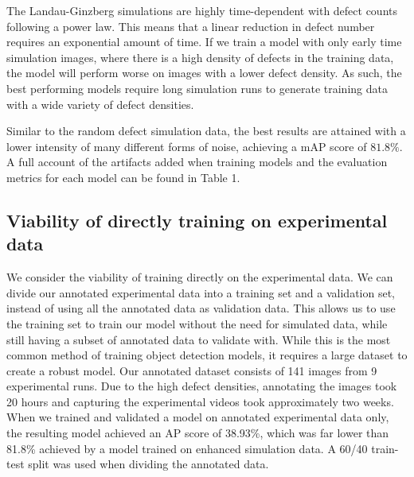 \documentclass[twoside,twocolumn,9pt]{article}
\begin{document}
\begin{table}[h!]
\end{table}

The Landau-Ginzberg simulations are highly time-dependent with defect counts following a power law. This means that a linear reduction in defect number requires an exponential amount of time. If we train a model with only early time simulation images, where there is a high density of defects in the training data, the model will perform worse on images with a lower defect density. As such, the best performing models require long simulation runs to generate training data with a wide variety of defect densities. 

Similar to the random defect simulation data, the best results are attained with a lower intensity of many different forms of noise, achieving a mAP score of $81.8\%$. A full account of the artifacts added when training models and the evaluation metrics for each model can be found in Table 1.

\subsection{Viability of directly training on experimental data}
We consider the viability of training directly on the experimental data. We can divide our annotated experimental data into a training set and a validation set, instead of using all the annotated data as validation data. This allows us to use the training set to train our model without the need for simulated data, while still having a subset of annotated data to validate with. While this is the most common method of training object detection models, it requires a large dataset to create a robust model. Our annotated dataset consists of 141 images from 9 experimental runs. Due to the high defect densities, annotating the images took 20 hours and capturing the experimental videos took approximately two weeks. When we trained and validated a model on annotated experimental data only, the resulting model achieved an AP score of  38.93\%, which was far lower than 81.8\% achieved by a model trained on enhanced simulation data. A 60/40 train-test split was used when dividing the annotated data.
\end{document}
